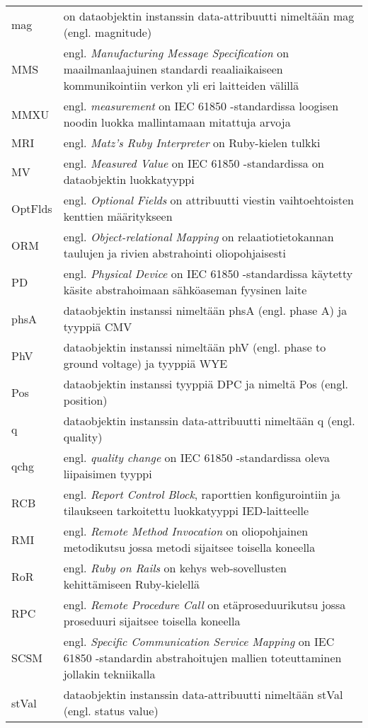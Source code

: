 \begin{tabularx}{\linewidth}[h]{@{} p{} p{} @{}}
	mag & on dataobjektin instanssin data-attribuutti nimeltään mag (engl. magnitude) \\
	MMS & engl. \emph{Manufacturing Message Specification} on maailmanlaajuinen standardi reaaliaikaiseen kommunikointiin verkon yli eri laitteiden välillä \\
	MMXU & engl. \emph{measurement} on IEC 61850 -standardissa loogisen noodin luokka mallintamaan mitattuja arvoja \\
	MRI & engl. \emph{Matz’s Ruby Interpreter} on Ruby-kielen tulkki \\
	MV & engl. \emph{Measured Value} on IEC 61850 -standardissa on dataobjektin luokkatyyppi \\
	OptFlds & engl. \emph{Optional Fields} on attribuutti viestin vaihtoehtoisten kenttien määritykseen \\
	ORM & engl. \emph{Object-relational Mapping} on relaatiotietokannan taulujen ja rivien abstrahointi oliopohjaisesti \\
	PD & engl. \emph{Physical Device} on IEC 61850 -standardissa käytetty käsite abstrahoimaan sähköaseman fyysinen laite \\
	phsA & dataobjektin instanssi nimeltään phsA (engl. phase A) ja tyyppiä CMV \\
	PhV & dataobjektin instanssi nimeltään phV (engl. phase to ground voltage) ja tyyppiä WYE \\
	Pos & dataobjektin instanssi tyyppiä DPC ja nimeltä Pos (engl. position) \\
	q & dataobjektin instanssin data-attribuutti nimeltään q (engl. quality) \\
	qchg & engl. \emph{quality change} on IEC 61850 -standardissa oleva liipaisimen tyyppi \\
	RCB & engl. \emph{Report Control Block}, raporttien konfigurointiin ja tilaukseen tarkoitettu luokkatyyppi IED-laitteelle \\
	RMI & engl. \emph{Remote Method Invocation} on oliopohjainen metodikutsu jossa metodi sijaitsee toisella koneella \\
	RoR & engl. \emph{Ruby on Rails} on kehys web-sovellusten kehittämiseen Ruby-kielellä \\
	RPC & engl. \emph{Remote Procedure Call} on etäproseduurikutsu jossa proseduuri sijaitsee toisella koneella \\
	SCSM & engl. \emph{Specific Communication Service Mapping} on IEC 61850 -standardin abstrahoitujen mallien toteuttaminen jollakin tekniikalla \\
	stVal & dataobjektin instanssin data-attribuutti nimeltään stVal (engl. status value) \\

\end{tabularx}
